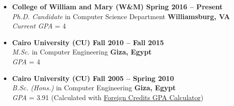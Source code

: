 \documentclass[10pt,a4]{article}
\begin{document}


\begin{itemize}

\item{\bf College of William and Mary (W\&M) \hfill {\bf Spring 2016 -- Present}} \\
{\it Ph.D. Candidate} in Computer Science Department \hfill {\bf Williamsburg, VA}\\
{\it Current GPA} = 4

\item{\bf Cairo University (CU) \hfill {\bf Fall 2010 -- Fall 2015}} \\
{\it M.Sc.} in Computer Engineering \hfill {\bf Giza, Egypt}\\
{\it GPA} = 4

\item{\bf Cairo University (CU) \hfill {\bf Fall 2005 -- Spring 2010}} \\
{\it B.Sc. (Hons.)} in Computer Engineering \hfill {\bf Giza, Egypt}\\
{\it GPA} = 3.91 (Calculated with \href{http://www.foreigncredits.com/Resources/GPA-Calculator/}{Foreign Credits GPA Calculator})

\end{itemize}
\end{document}
